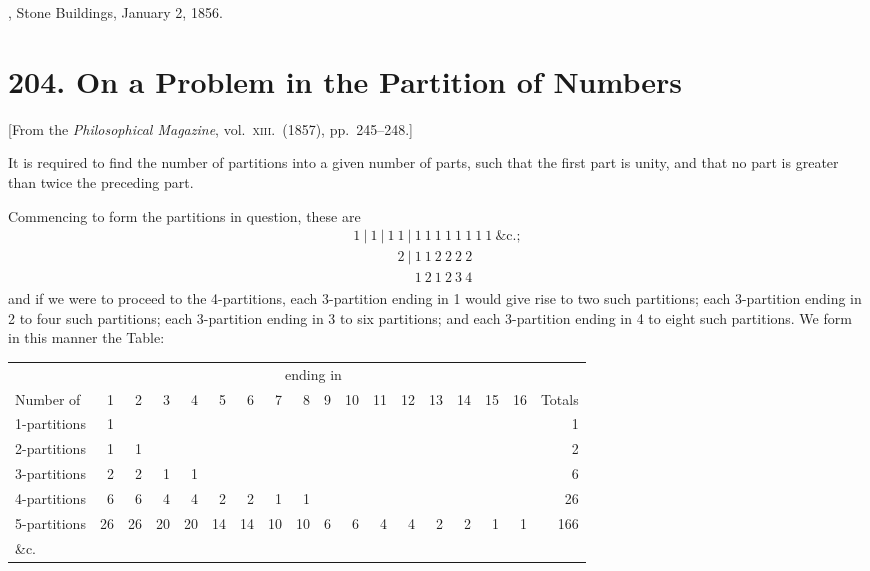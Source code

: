 \documentclass[12pt,a4paper]{article}
\theoremstyle{plain}
\begin{document}
, Stone Buildings, January 2, 1856.

\vfill\newpage


\section*{204. On a Problem in the Partition of Numbers}

\begin{center}
[From the \textit{Philosophical Magazine}, vol.~\textsc{xiii}.\ (1857), pp.~245--248.]
\end{center}

\medskip

\noindent It is required to find the number of partitions into a given number of parts, such that the first part is unity, and that no part is greater than twice the preceding part.

\medskip

Commencing to form the partitions in question, these are
\[
\begin{array}{l}
1\ |\ 1\ |\ 1\ 1\ |\ 1\ 1\ 1\ 1\ 1\ 1\ 1\ 1\ \&\mathrm{c}.;\\
\phantom{1\ |\ 1\ |\ 1\ }2\ |\ 1\ 1\ 2\ 2\ 2\ 2\\
\phantom{1\ |\ 1\ |\ 1\ 2\ |\ }1\ 2\ 1\ 2\ 3\ 4
\end{array}
\]
and if we were to proceed to the 4-partitions, each 3-partition ending in 1 would give rise to two such partitions; each 3-partition ending in 2 to four such partitions; each 3-partition ending in 3 to six partitions; and each 3-partition ending in 4 to eight such partitions. We form in this manner the Table:

\medskip

\begin{center}
\renewcommand{\arraystretch}{1.15}
\begin{tabular}{|l|*{16}{r}|r|}
\hline
& \multicolumn{16}{c|}{ending in} & \\
Number of & 1 & 2 & 3 & 4 & 5 & 6 & 7 & 8 & 9 & 10 & 11 & 12 & 13 & 14 & 15 & 16 & Totals\\\hline
1-partitions & 1 &   &   &   &   &   &   &   &   &   &   &   &   &   &   &   & 1\\
2-partitions & 1 & 1 &   &   &   &   &   &   &   &   &   &   &   &   &   &   & 2\\
3-partitions & 2 & 2 & 1 & 1 &   &   &   &   &   &   &   &   &   &   &   &   & 6\\
4-partitions & 6 & 6 & 4 & 4 & 2 & 2 & 1 & 1 &   &   &   &   &   &   &   &   & 26\\
5-partitions & 26 & 26 & 20 & 20 & 14 & 14 & 10 & 10 & 6 & 6 & 4 & 4 & 2 & 2 & 1 & 1 & 166\\
\&c. & & & & & & & & & & & & & & & & & \\
\hline
\end{tabular}
\end{center}
\end{document}
